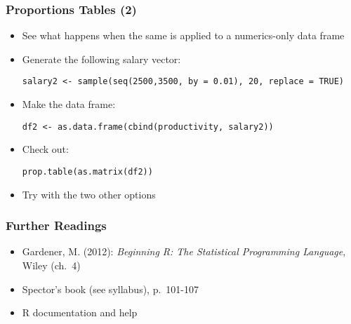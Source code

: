 \documentclass[10pt]{beamer}
\theoremstyle{definition}
\begin{document}
\begin{frame}[fragile]
\frametitle{Proportions Tables (2)}
\begin{itemize}
	\item See what happens when the same is applied to a numerics-only data frame
	
	\item Generate the following salary vector:
	\begin{lstlisting}[style = rstyle, breaklines]
	salary2 <- sample(seq(2500,3500, by = 0.01), 20, replace = TRUE)
	\end{lstlisting}
	
	\item Make the data frame:
	\begin{lstlisting}[style = rstyle, breaklines]
	df2 <- as.data.frame(cbind(productivity, salary2))
	\end{lstlisting}

	\item Check out:
	\begin{lstlisting}[style = rstyle, breaklines]
	prop.table(as.matrix(df2))
	\end{lstlisting}

	\item Try with the two other options
\end{itemize}
\end{frame}

\begin{frame}[fragile]
\frametitle{Further Readings}
\begin{itemize}
	\item Gardener, M. (2012): \emph{Beginning R: The Statistical Programming Language}, Wiley (ch.~4)

	\item Spector's book (see syllabus), p.~101-107
	
	\item R documentation and help
\end{itemize}
\end{frame}
\end{document}
